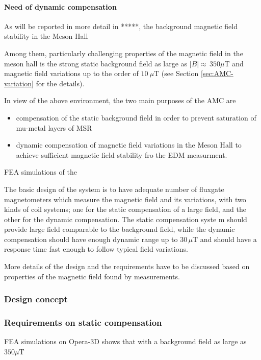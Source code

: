 \paragraph*{Need of dynamic compensation }



As will be reported in more detail in *****, the background magnetic field stability in the Meson Hall 



Among them,  particularly challenging properties  of the magnetic field in the meson hall is the strong static background field as large as  $|B|\approx\,350\mu$T and magnetic field variations up to the  order of $10~\mu$T (see Section \ref{sec:AMC-variation} for the details).

In view of the above environment,  the two main purposes of the AMC  are
\begin{itemize}
\item compensation of the static background field in order to prevent saturation of mu-metal layers of MSR
\item dynamic compensation of magnetic field variations in the Meson Hall to achieve sufficient magnetic field stability fro the EDM measurment.
\end{itemize}
FEA simulations of the 

    
    The basic design of the system is to have adequate number of fluxgate magnetometers which measure the magnetic  field and its variations, with two kinds of coil systems; one for the  static compensation of a large field, and the other for the dynamic compensation. The static compensation syste m should provide large field comparable to the background field, while the dynamic compensation should have enough dynamic range up to $30\,\mu$T and should have a response time fast enough to follow typical field variations.
    
    More details of the design and the requirements have to be discussed based on properties of the magnetic field found by measurements. 

\subsubsection{Design concept}

\subsubsection{Requirements on static compensation}
FEA simulations on Opera-3D shows that with a background field as large as  $350\mu$T


